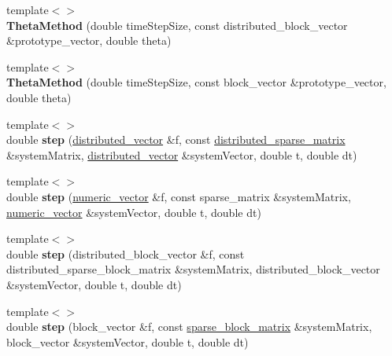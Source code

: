 \begin{DoxyCompactItemize}
\item 
\hypertarget{classnatrium_1_1ThetaMethod_ac5b08a9ab08f4f61779dc818a6dac3b2}{
{\footnotesize template$<$$>$ }\\{\bfseries ThetaMethod} (double timeStepSize, const distributed\_\-block\_\-vector \&prototype\_\-vector, double theta)}
\label{classnatrium_1_1ThetaMethod_ac5b08a9ab08f4f61779dc818a6dac3b2}

\item 
\hypertarget{classnatrium_1_1ThetaMethod_a6329a87c9fd50d6db3546b892b716b3c}{
{\footnotesize template$<$$>$ }\\{\bfseries ThetaMethod} (double timeStepSize, const block\_\-vector \&prototype\_\-vector, double theta)}
\label{classnatrium_1_1ThetaMethod_a6329a87c9fd50d6db3546b892b716b3c}

\item 
\hypertarget{classnatrium_1_1ThetaMethod_a85ff32df10d08008b15048325e83c3b8}{
{\footnotesize template$<$$>$ }\\double {\bfseries step} (\hyperlink{namespacenatrium_a903d2b92917f582f2ff05f52160ab811}{distributed\_\-vector} \&f, const \hyperlink{namespacenatrium_a860e92befb23651241c8b3d61a0d4034}{distributed\_\-sparse\_\-matrix} \&systemMatrix, \hyperlink{namespacenatrium_a903d2b92917f582f2ff05f52160ab811}{distributed\_\-vector} \&systemVector, double t, double dt)}
\label{classnatrium_1_1ThetaMethod_a85ff32df10d08008b15048325e83c3b8}

\item 
\hypertarget{classnatrium_1_1ThetaMethod_a49620e2e027e6e512258fcd9a60c0d71}{
{\footnotesize template$<$$>$ }\\double {\bfseries step} (\hyperlink{namespacenatrium_a67c39077adc6634f8fa3762b8eef24c4}{numeric\_\-vector} \&f, const sparse\_\-matrix \&systemMatrix, \hyperlink{namespacenatrium_a67c39077adc6634f8fa3762b8eef24c4}{numeric\_\-vector} \&systemVector, double t, double dt)}
\label{classnatrium_1_1ThetaMethod_a49620e2e027e6e512258fcd9a60c0d71}

\item 
\hypertarget{classnatrium_1_1ThetaMethod_a0c2550f6a2033c91b73a7116a7b8a29c}{
{\footnotesize template$<$$>$ }\\double {\bfseries step} (distributed\_\-block\_\-vector \&f, const distributed\_\-sparse\_\-block\_\-matrix \&systemMatrix, distributed\_\-block\_\-vector \&systemVector, double t, double dt)}
\label{classnatrium_1_1ThetaMethod_a0c2550f6a2033c91b73a7116a7b8a29c}

\item 
\hypertarget{classnatrium_1_1ThetaMethod_af8a464bd93042c5e5f006e5ff9b4d8a4}{
{\footnotesize template$<$$>$ }\\double {\bfseries step} (block\_\-vector \&f, const \hyperlink{namespacenatrium_acd63e25d68fdb74dd9b789bb2e836cb8}{sparse\_\-block\_\-matrix} \&systemMatrix, block\_\-vector \&systemVector, double t, double dt)}
\label{classnatrium_1_1ThetaMethod_af8a464bd93042c5e5f006e5ff9b4d8a4}

\end{DoxyCompactItemize}


